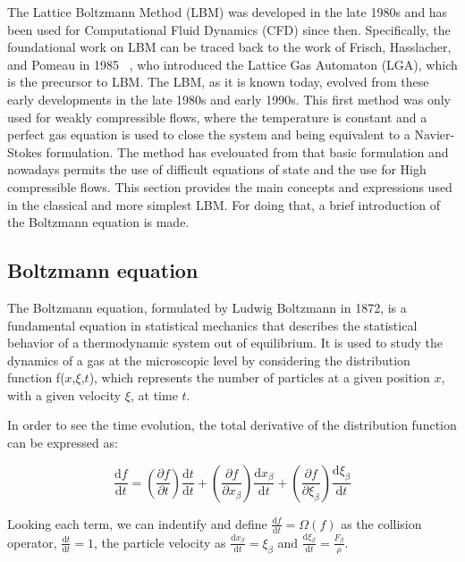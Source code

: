 The Lattice Boltzmann Method (LBM) was developed in the late 1980s and has been
used for Computational Fluid Dynamics (CFD) since then. Specifically, the
foundational work on LBM can be traced back to the work of Frisch, Hasslacher,
and Pomeau in 1985 ~\cite{frisch1985lattice}, who introduced the Lattice Gas
Automaton (LGA), which is the precursor to LBM. The LBM, as it is known today,
evolved from these early developments in the late 1980s and early 1990s. This
first method was only used for weakly compressible flows, where the temperature
is constant and a perfect gas equation is used to close the system and being
equivalent to a Navier-Stokes formulation. The method has evelouated from that
basic formulation and nowadays permits the use of difficult equations of state
and the use for High compressible flows. This section provides the main concepts
and expressions used in the classical and more simplest LBM. For doing that, a
brief introduction of the Boltzmann equation is made. 

\subsection{Boltzmann equation}
The Boltzmann equation, formulated by Ludwig Boltzmann in 1872, is a fundamental
equation in statistical mechanics that describes the statistical behavior of a
thermodynamic system out of equilibrium. It is used to study the dynamics of a
gas at the microscopic level by considering the distribution function
f($x$,$\xi$,$t$), which represents the number of particles at a given position
$x$, with a given velocity $\xi$, at time $t$.

In order to see the time evolution, the total derivative of the distribution
function can be expressed as:

\begin{equation}
	\frac{\mathrm{d}f}{\mathrm{d}t} = 
	\left(\frac{\partial f}{\partial t}\right)\frac{\mathrm{d}t}{\mathrm{d}t}
	+\left(\frac{\partial f}{\partial x_{\beta}}\right)\frac{\mathrm{d}x_{\beta}}{\mathrm{d}t}
	+\left(\frac{\partial f}{\partial \xi_{\beta}}\right)\frac{\mathrm{d}\xi_{\beta}}{\mathrm{d}t}
\end{equation}

Looking each term, we can indentify and define $\frac{\mathrm{d}f}{\mathrm{d}t}
= \Omega(f)$ as the collision operator, $\frac{\mathrm{d}t}{\mathrm{d}t}=1$, the
particle velocity as $\frac{\mathrm{d}x_{\beta}}{\mathrm{d}t} = \xi_{\beta}$ and
$\frac{\mathrm{d}\xi_{\beta}}{\mathrm{d}t} = \frac{F_{\beta}}{\rho}$.

